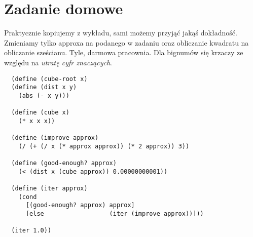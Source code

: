 \documentclass[a4paper]{article}
\begin{document}
\section{Zadanie domowe}
Praktycznie kopiujemy z wykładu, sami możemy przyjąć jakąś dokładność. Zmieniamy tylko approxa na podanego w zadaniu oraz obliczanie kwadratu na obliczanie sześcianu. Tyle, darmowa pracownia. Dla bignumów się krzaczy ze względu na \textit{utratę cyfr znaczących}.
\begin{lstlisting}
  (define (cube-root x)
  (define (dist x y)
    (abs (- x y)))

  (define (cube x)
    (* x x x))

  (define (improve approx)
    (/ (+ (/ x (* approx approx)) (* 2 approx)) 3))

  (define (good-enough? approx)
    (< (dist x (cube approx)) 0.00000000001))

  (define (iter approx)
    (cond
      [(good-enough? approx) approx]
      [else                  (iter (improve approx))]))
  
  (iter 1.0))
\end{lstlisting}  
\end{document}
